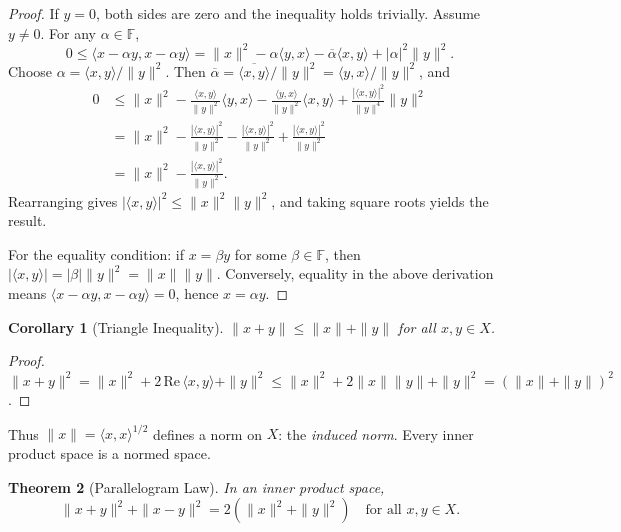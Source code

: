\documentclass[11pt,a4paper]{article}
\theoremstyle{definition}
\theoremstyle{plain}
\newtheorem{theorem}{Theorem}[section]
\newtheorem{corollary}[theorem]{Corollary}
\theoremstyle{remark}
\begin{document}
\begin{proof}
If $y = 0$, both sides are zero and the inequality holds trivially.
Assume $y \neq 0$. For any $\alpha \in \mathbb{F}$,
\[
    0 \leq \langle x - \alpha y, x - \alpha y \rangle
    = \|x\|^2 - \alpha \langle y, x \rangle
      - \overline{\alpha} \langle x, y \rangle
      + |\alpha|^2 \|y\|^2.
\]
Choose $\alpha = \langle x, y \rangle / \|y\|^2$. Then
$\overline{\alpha} = \overline{\langle x, y \rangle} / \|y\|^2
= \langle y, x \rangle / \|y\|^2$, and
\begin{align*}
    0 &\leq \|x\|^2
        - \frac{\langle x, y \rangle}{\|y\|^2} \langle y, x \rangle
        - \frac{\langle y, x \rangle}{\|y\|^2} \langle x, y \rangle
        + \frac{|\langle x, y \rangle|^2}{\|y\|^4} \|y\|^2 \\
      &= \|x\|^2
        - \frac{|\langle x, y \rangle|^2}{\|y\|^2}
        - \frac{|\langle x, y \rangle|^2}{\|y\|^2}
        + \frac{|\langle x, y \rangle|^2}{\|y\|^2} \\
      &= \|x\|^2 - \frac{|\langle x, y \rangle|^2}{\|y\|^2}.
\end{align*}
Rearranging gives $|\langle x, y \rangle|^2 \leq \|x\|^2 \|y\|^2$, and
taking square roots yields the result.

For the equality condition: if $x = \beta y$ for some $\beta \in \mathbb{F}$,
then $|\langle x, y \rangle| = |\beta| \|y\|^2 = \|x\| \|y\|$.
Conversely, equality in the above derivation means
$\langle x - \alpha y, x - \alpha y \rangle = 0$, hence $x = \alpha y$.
\end{proof}

\begin{corollary}[Triangle Inequality]\label{cor:triangle}
$\|x + y\| \leq \|x\| + \|y\|$ for all $x, y \in X$.
\end{corollary}

\begin{proof}
$\|x + y\|^2 = \|x\|^2 + 2\,\mathrm{Re}\,\langle x, y \rangle + \|y\|^2
\leq \|x\|^2 + 2\|x\|\|y\| + \|y\|^2 = (\|x\| + \|y\|)^2$.
\end{proof}

Thus $\|x\| = \langle x, x \rangle^{1/2}$ defines a norm on $X$: the
\emph{induced norm}. Every inner product space is a normed space.

\begin{theorem}[Parallelogram Law]\label{thm:parallelogram}
In an inner product space,
\[
    \|x + y\|^2 + \|x - y\|^2 = 2(\|x\|^2 + \|y\|^2)
    \quad \text{for all } x, y \in X.
\]
\end{theorem}
\end{document}
